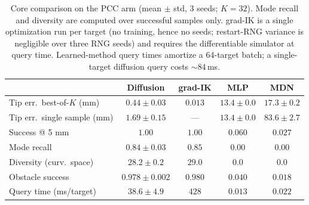 \begin{table}[t]
\caption{Core comparison on the PCC arm (mean $\pm$ std, 3 seeds; $K{=}32$).
Mode recall and diversity are computed over successful samples only.
grad-IK is a single optimization run per target (no training, hence no
seeds; restart-RNG variance is negligible over three RNG seeds) and
requires the differentiable simulator at query time. Learned-method query
times amortize a 64-target batch; a single-target diffusion query costs
${\sim}84\,$ms.}
\label{tab:core}
\centering
\scriptsize
\setlength{\tabcolsep}{2.2pt}
\begin{tabular}{lcccc}
\toprule
 & Diffusion & grad-IK & MLP & MDN \\
\midrule
Tip err.\ best-of-$K$ (mm) & $0.44\pm0.03$ & $\mathbf{0.013}$ & $13.4\pm0.0$ & $17.3\pm0.2$ \\
Tip err.\ single sample (mm) & $\mathbf{1.69\pm0.15}$ & --- & $13.4\pm0.0$ & $83.6\pm2.7$ \\
Success @ 5 mm & $\mathbf{1.00}$ & $\mathbf{1.00}$ & $0.060$ & $0.027$ \\
Mode recall & $0.84\pm0.03$ & $\mathbf{0.85}$ & $0.00$ & $0.00$ \\
Diversity (curv.\ space) & $28.2\pm0.2$ & $\mathbf{29.0}$ & $0.0$ & $0.0$ \\
Obstacle success & $0.978\pm0.002$ & $\mathbf{0.980}$ & $0.040$ & $0.018$ \\
Query time (ms/target) & $38.6\pm4.9$ & $428$ & $\mathbf{0.013}$ & $0.022$ \\
\bottomrule
\end{tabular}
\end{table}

